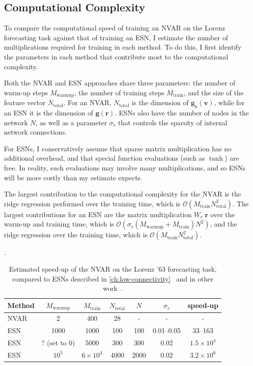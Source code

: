 \subsection{Computational Complexity}

To compare the computational speed of training an NVAR on the Lorenz
forecasting task against that of training an ESN, I estimate the
number of multiplications required for training in each method. To do
this, I first identify the parameters in each method that contribute
most to the computational complexity.

Both the NVAR and ESN approaches share three parameters: the number of
warm-up steps $M_\text{warmup}$, the number of training steps
$M_\text{train}$, and the size of the feature vector
$N_\text{total}$. For an NVAR, $N_\text{total}$ is the dimension of
$\bm{g}_\text{n}(\bm{v})$, while for an ESN it is the dimension of
$\bm{g}(\bm{r})$. ESNs also have the number of nodes in the network
$N$, as well as a parameter $\sigma_r$ that controls the sparsity of
internal network connections.

For ESNs, I conservatively assume that sparse matrix multiplication
has no additional overhead, and that special function evaluations
(such as $\tanh$) are free. In reality, such evaluations may involve
many multiplications, and so ESNs will be more costly than my
estimate expects.

The largest contribution to the computational complexity for the NVAR
is the ridge regression performed over the training time, which is
$\mathcal{O}(M_\text{train}N_\text{total}^2)$. The largest
contributions for an ESN are the matrix multiplication $W_r\;\bm{r}$
over the warm-up and training time, which is
$\mathcal{O}\left(\sigma_r\left(M_\text{warmup} +
M_\text{train}\right)N^2\right)$, and the ridge
regression over the training time, which is
$\mathcal{O}(M_\text{train}N_\text{total}^2)$.

\begin{table}
  \caption{Estimated speed-up of the NVAR on the Lorenz '63
    forecasting task, compared to ESNs described in
    \cref{ch:low-connectivity}~\cite{griffith2019} and in other
    work~\cite{pathak2017,lu2018}.}.
  \begin{tabular}{lcccccc}
    Method & $M_\text{warmup}$ & $M_\text{train}$ & $N_\text{total}$ & $N$ & $\sigma_r$ & speed-up \\
    \hline
    \rule{0pt}{4ex}%
    NVAR & 2 & 400 & 28 & - & - & - \\
    \rule{0pt}{4ex}%
    ESN~\cite{griffith2019} & 1000 & 1000 & 100 & 100 & 0.01--0.05 & 33--163 \\
    ESN~\cite{pathak2017} & ? (set to 0) & 5000 & 300 & 300 & 0.02 & $1.5\times10^3$ \\
    ESN~\cite{lu2018} & $10^5$ & $6\times10^4$ & 4000 & 2000 & 0.02 & $3.2\times10^6$ \\
  \end{tabular}
  \label{tab:nvar-complexity}
\end{table}

